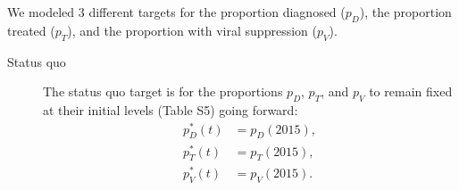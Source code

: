 \documentclass{article}
\begin{document}
We modeled 3 different targets for the proportion diagnosed ($p_D$), the
proportion treated ($p_T$), and the proportion with viral suppression ($p_V$).
\begin{description}
\item[Status quo] The status quo target is for the proportions $p_D$,
  $p_T$, and $p_V$ to remain fixed at their initial levels (Table S5)
  going forward:
  \begin{equation}
    \label{status_quo_target}
    \begin{split}
      p_D^*(t) &= p_D(2015), \\
      p_T^*(t) &= p_T(2015), \\
      p_V^*(t) &= p_V(2015).
    \end{split}
  \end{equation}


\end{description}
\end{document}
